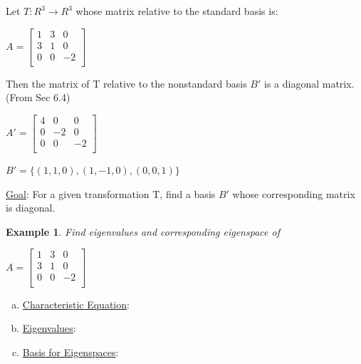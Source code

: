 \documentclass[12pt]{article}
\newtheorem{ex}{Example}
\begin{document}
\vspace{.1in}


Let $ T: R^3 \rightarrow R^3$ whose matrix relative to the standard basis is:

\begin{center}
$A = \begin{bmatrix}
1	&	3	&	0	\\
3	&	1	&	0	\\
0	&	0	&	-2	\\
\end{bmatrix}$
\end{center}

Then the matrix of T relative to the nonstandard basis $B'$ is a diagonal matrix. (From Sec 6.4)

\begin{multicols}{2}

$A' = \begin{bmatrix}
4	&	0	&	0\\
0	&	-2	&	0\\
0	&	0	&	-2\\
\end{bmatrix}$


$B' = \{ (1, 1, 0), (1, -1, 0), (0, 0, 1) \}$

\end{multicols}

\vspace{.1in}

\underline{Goal}: For a given transformation T, find a basis $B'$ whose corresponding matrix is diagonal.


\pagebreak

\begin{ex}

Find eigenvalues and corresponding eigenspace of 

\begin{center}

$A = \begin{bmatrix}
1	&	3	&	0\\
3	&	1	&	0\\
0	&	0	&	-2\\
\end{bmatrix}$

\end{center}
\end{ex}

\begin{enumerate}[a)]

\item
\underline{Characteristic Equation}:
\vfill

\item
\underline{Eigenvalues}:
\vfill

\item
\underline{Basis for Eigenspaces}:
\vfill
\end{enumerate}
\end{document}
